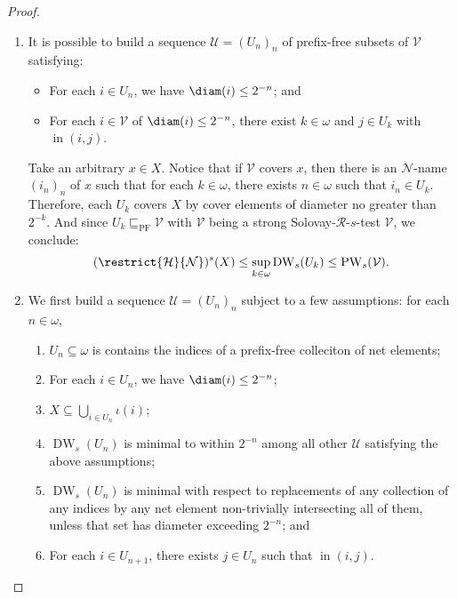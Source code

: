 \begin{proof}
    \begin{enumerate}[label = (\roman*)]
        \item It is possible to build a sequence $\mathcal{U} = (U_n)_n$ of prefix-free subsets of $\mathcal{V}$ satisfying:
            \begin{itemize}
                \item For each $i \in U_n$, we have $\diam(i) \leq 2^{-n}$; and 
                \item For each $i \in \mathcal{V}$ of $\diam(i) \leq 2^{-n}$, there exist $k \in \omega$ and $j \in U_k$ with $\operatorname{in}(i, j)$.
            \end{itemize}
            Take an arbitrary $x \in X$. Notice that if $\mathcal{V}$ covers $x$, then there is an $\mathcal{N}$-name $(i_n)_n$ of $x$ such that for each $k \in \omega$, there exists $n \in \omega$ such that $i_n \in U_k$. Therefore, each $U_k$ covers $X$ by cover elements of diameter no greater than $2^{-k}$. And since $U_k \sqsubseteq_{\operatorname{PF}} \mathcal{V}$ with $\mathcal{V}$ being a strong Solovay-$\mathscr{R}$-$s$-test $\mathcal{V}$, we conclude:
            \begin{align*}
                (\restrict{\mathcal{H}}{\mathcal{N}})^s(X) \leq \sup_{k \in \omega} \operatorname{DW}_s(U_k) \leq \operatorname{PW}_s(\mathcal{V}).
            \end{align*}
        \item We first build a sequence $\mathcal{U} = (U_n)_n$ subject to a few assumptions: for each $n \in \omega$,
            \begin{enumerate}[label = (\alph*)]
                \item $U_n \subseteq \omega$ is contains the indices of a prefix-free colleciton of net elements;
                \item For each $i \in U_n$, we have $\diam(i) \leq 2^{-n}$;
                \item $X \subseteq \bigcup_{i \in U_n} \iota(i)$;
                \item $\operatorname{DW}_s(U_n)$ is minimal to within $2^{-n}$ among all other $\mathcal{U}$ satisfying the above assumptions;
                \item $\operatorname{DW}_s(U_n)$ is minimal with respect to replacements of any collection of any indices by any net element non-trivially intersecting all of them, unless that set has diameter exceeding $2^{-n}$; and
                \item For each $i \in U_{n + 1}$, there exists $j \in U_n$ such that $\operatorname{in}(i, j)$.

\end{enumerate}
\end{enumerate}
\end{proof}
